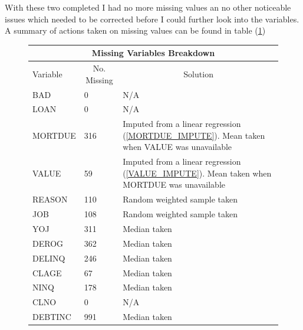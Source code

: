 With these two completed I had no more missing values an no other noticeable issues which needed to be corrected before I could further look into the variables. A summary of actions taken on missing values can be found in table (\ref{data_clean})

\begin{figure}[ht]\label{data_clean}
	\centering
	\renewcommand{\arraystretch}{1.25}
	\begin{tabular}{l p{3cm} p{9cm}}
	\multicolumn{3}{c}{Missing Variables Breakdown}\\
	\hline
	Variable & \multicolumn{1}{c}{No. Missing} & \multicolumn{1}{c}{Solution}\\ 
	\hline
	BAD & 0 & N/A\\
	LOAN & 0 & N/A \\
	MORTDUE & 316 & Imputed from a linear regression (\ref{MORTDUE_IMPUTE}). Mean taken when VALUE was unavailable \\
	VALUE & 59 & Imputed from a linear regression (\ref{VALUE_IMPUTE}). Mean taken when MORTDUE was unavailable \\
	REASON & 110 & Random weighted sample taken \\
	JOB & 108 & Random weighted sample taken \\
	YOJ & 311 & Median taken\\
	DEROG & 362 & Median taken \\
	DELINQ & 246 & Median taken\\
	CLAGE & 67 & Median taken \\
	NINQ & 178 & Median taken\\
	CLNO & 0 & N/A \\
	DEBTINC & 991 & Median taken\\
	\end{tabular}
\end{figure}

